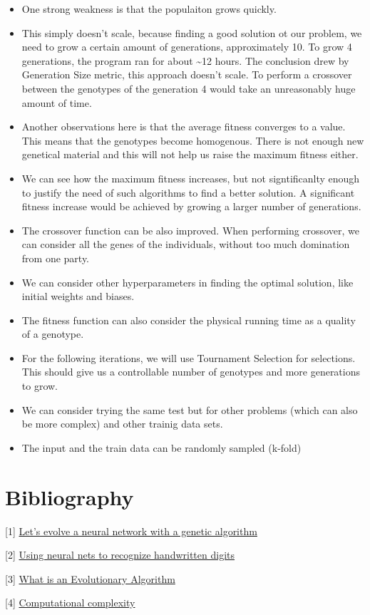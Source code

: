 \documentclass[11pt]{article}
\begin{document}
\begin{itemize}
\item
  One strong weakness is that the populaiton grows quickly.
\item
  This simply doesn't scale, because finding a good solution ot our
  problem, we need to grow a certain amount of generations,
  approximately 10. To grow 4 generations, the program ran for about
  \textasciitilde{}12 hours. The conclusion drew by Generation Size
  metric, this approach doesn't scale. To perform a crossover between
  the genotypes of the generation 4 would take an unreasonably huge
  amount of time.
\item
  Another observations here is that the average fitness converges to a
  value. This means that the genotypes become homogenous. There is not
  enough new genetical material and this will not help us raise the
  maximum fitness either.
\item
  We can see how the maximum fitness increases, but not signtificanlty
  enough to justify the need of such algorithms to find a better
  solution. A significant fitness increase would be achieved by growing
  a larger number of generations.
\item
  The crossover function can be also improved. When performing
  crossover, we can consider all the genes of the individuals, without
  too much domination from one party.
\item
  We can consider other hyperparameters in finding the optimal solution,
  like initial weights and biases.
\item
  The fitness function can also consider the physical running time as a
  quality of a genotype.
\item
  For the following iterations, we will use Tournament Selection for
  selections. This should give us a controllable number of genotypes and
  more generations to grow.
\item
  We can consider trying the same test but for other problems (which can
  also be more complex) and other trainig data sets.
\item
  The input and the train data can be randomly sampled (k-fold)
\end{itemize}

    \hypertarget{bibliography}{%
\section{Bibliography}\label{bibliography}}

{[}1{]}
\href{https://blog.coast.ai/lets-evolve-a-neural-network-with-a-genetic-algorithm-code-included-8809bece164}{Let's
evolve a neural network with a genetic algorithm}

{[}2{]} \href{http://neuralnetworksanddeeplearning.com/chap1.html}{Using
neural nets to recognize handwritten digits}

{[}3{]}
\href{https://www.cs.vu.nl/~gusz/ecbook/Eiben-Smith-Intro2EC-Ch2.pdf}{What
is an Evolutionary Algorithm}

{[}4{]}
\href{https://en.wikipedia.org/wiki/Computational_complexity}{Computational
complexity}


    
    
    
    
\end{document}
